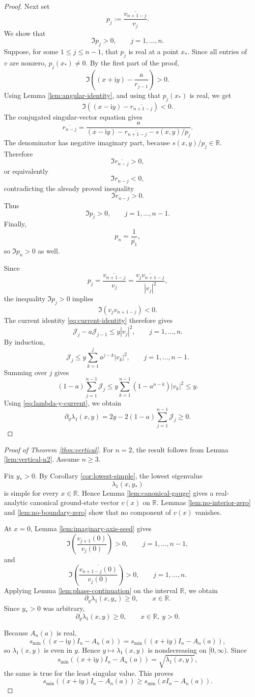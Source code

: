 \documentclass[11pt]{amsart}
\numberwithin{equation}{section}
\newcommand{\R}{\mathbb R}
\newcommand{\ii}{\mathrm i}
\begin{document}
\begin{proof}
Next set
\[
p_j:=\frac{\overline{v_{n+1-j}}}{v_j}.
\]
We show that
\[
\Im p_j>0,
\qquad
j=1,\dots,n.
\]
Suppose, for some \(1\le j\le n-1\), that \(p_j\) is real at a point \(x_*\).  Since all entries of \(v\) are nonzero, \(p_j(x_*)\ne0\).  By the first part of the proof,
\[
\Im\left((x+\ii y)-\frac{a}{r_{j-1}}\right)>0.
\]
Using Lemma \ref{lem:angular-identity}, and using that \(p_j(x_*)\) is real, we get
\[
\Im\left((x-\ii y)-\overline{r_{n+1-j}}\right)<0.
\]
The conjugated singular-vector equation gives
\[
\overline{r_{n-j}}
=
\frac{a}
{(x-\ii y)-\overline{r_{n+1-j}}-s(x,y)/p_j}.
\]
The denominator has negative imaginary part, because \(s(x,y)/p_j\in\R\).  Therefore
\[
\Im\overline{r_{n-j}}>0,
\]
or equivalently
\[
\Im r_{n-j}<0,
\]
contradicting the already proved inequality
\[
\Im r_{n-j}>0.
\]
Thus
\[
\Im p_j>0,
\qquad
j=1,\dots,n-1.
\]
Finally,
\[
p_n=\frac{1}{\overline{p_1}},
\]
so \(\Im p_n>0\) as well.

Since
\[
p_j
=
\frac{\overline{v_{n+1-j}}}{v_j}
=
\frac{\overline{v_jv_{n+1-j}}}{|v_j|^2},
\]
the inequality \(\Im p_j>0\) implies
\[
\Im(v_jv_{n+1-j})<0.
\]
The current identity \eqref{eq:current-identity} therefore gives
\[
\mathcal J_j-a\mathcal J_{j-1}
\le
y|v_j|^2,
\qquad
j=1,\dots,n.
\]
By induction,
\[
\mathcal J_j
\le
y\sum_{k=1}^j a^{j-k}|v_k|^2,
\qquad
j=1,\dots,n-1.
\]
Summing over \(j\) gives
\[
(1-a)\sum_{j=1}^{n-1}\mathcal J_j
\le
y\sum_{k=1}^{n-1}(1-a^{n-k})|v_k|^2
\le
y.
\]
Using \eqref{eq:lambda-y-current}, we obtain
\[
\partial_y\lambda_1(x,y)
=
2y-2(1-a)\sum_{j=1}^{n-1}\mathcal J_j
\ge0.
\]
\end{proof}

\begin{proof}[Proof of Theorem \ref{thm:vertical}]
For \(n=2\), the result follows from Lemma \ref{lem:vertical-n2}.  Assume \(n\ge3\).

Fix \(y_*>0\).  By Corollary \ref{cor:lowest-simple}, the lowest eigenvalue
\[
\lambda_1(x,y_*)
\]
is simple for every \(x\in\R\).  Hence Lemma \ref{lem:canonical-gauge} gives a real-analytic canonical ground-state vector \(v(x)\) on \(\R\).  Lemmas \ref{lem:no-interior-zero} and \ref{lem:no-boundary-zero} show that no component of \(v(x)\) vanishes.

At \(x=0\), Lemma \ref{lem:imaginary-axis-seed} gives
\[
\Im\left(\frac{v_{j+1}(0)}{v_j(0)}\right)>0,
\qquad
j=1,\dots,n-1,
\]
and
\[
\Im\left(\frac{\overline{v_{n+1-j}(0)}}{v_j(0)}\right)>0,
\qquad
j=1,\dots,n.
\]
Applying Lemma \ref{lem:phase-continuation} on the interval \(\R\), we obtain
\[
\partial_y\lambda_1(x,y_*)\ge0,
\qquad
x\in\R.
\]
Since \(y_* >0\) was arbitrary,
\[
\partial_y\lambda_1(x,y)\ge0,
\qquad
x\in\R,\ y>0.
\]

Because \(A_n(a)\) is real,
\[
s_{\min}((x-\ii y)I_n-A_n(a))
=
s_{\min}((x+\ii y)I_n-A_n(a)),
\]
so \(\lambda_1(x,y)\) is even in \(y\).  Hence \(y\mapsto\lambda_1(x,y)\) is nondecreasing on \([0,\infty)\).  Since
\[
s_{\min}((x+\ii y)I_n-A_n(a))=\sqrt{\lambda_1(x,y)},
\]
the same is true for the least singular value.  This proves
\[
s_{\min}((x+\ii y)I_n-A_n(a))
\ge
s_{\min}(xI_n-A_n(a)).
\]
\end{proof}
\end{document}
